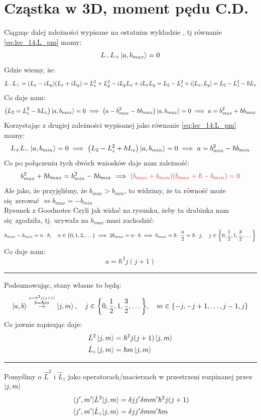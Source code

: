 \documentclass[12pt,a4paper]{report}
\newcommand{\com}[1]{{\color{red} #1}}
\newcommand{\linediv}{{\color{RubineRed} \rule{\linewidth}{0.5mm}}}
\newenvironment{lecture}[1]{\par\medskip
   \noindent\chapter{#1} \rmfamily}{\medskip}
\begin{document}

\begin{lecture}{Cząstka w 3D, moment pędu C.D.}
Ciągnąc dalej zależności wypisane na ostatnim wykładzie , tj równanie \eqref{eq:lec_14:L_pm} mamy:
\[
    L_{-}L_{+} \ket{a,b_{max}} = 0
\]
Gdzie wiemy, że:
\[
    L_{-}L_{+} = (L_x-iL_y)(L_x+iL_y) = L_x^2+L_y^2 - iL_yL_x + iL_xL_y = L_2 - L_z^2 + i\comm{L_x}{L_y} = L_2-L_z^2 -\hbar L_z
\]
Co daje nam:
\[
    \qty(L_2 = L_z^2 - \hbar L_z) \ket{a, b_{max}} = 0 \implies \qty(a - b^2_{max} - \hbar b_{max})\ket{a, b_{max}} = 0 \implies a = b_{max}^2 +\hbar b_{max}
\]
Korzystając z drugiej zależności wypisanej jako równanie \eqref{eq:lec_14:L_pm} mamy:
\[
    L_{+}L_{-}\ket{a, b_{min}} = 0 \implies \qty(L_2 - L_z^2 + \hbar L_z)\ket{a, b_{min}} = 0 \implies a = b_{min}^2 - \hbar b_{min}
\]
Co po połączeniu tych dwóch wniosków daje nam zależność:
\[
    b_{max}^2 + \hbar b_{max} = b_{min}^2 - \hbar b_{min} \implies \color{Red} \qty(b_{max} + b_{min})\qty(b_{max} + \hbar - b_{min}) = 0
\]
Ale jako, że przyjęliśmy, że $b_{max} > b_{min}$, to widzimy, że ta równość może się zerować $\iff b_{max} = - b_{min}$\\
\com{Rysunek z Goodnotes}
Czyli jak widać na rysunku, żeby ta drabinka nam się zgodziła, tj. urywała na $b_{max}$ musi zachodzić:
\[
    b_{max} - b_{min} = n \cdot \hbar \qc n\in\qty{0, 1, 2, \dots} \implies 2 b_{max} = n \cdot \hbar \implies b_{max} = \hbar \cdot \frac{n}{2} = \hbar \cdot j\qc j\in\qty{0, \frac12, 1,\frac32,\dots}
\]
Co daje nam:
\[
    a = \hbar^2 j (j+1)
\]

\linediv

Podsumowując, stany własne to będą:
\[
    \ket{a,b} \stackrel{\stackrel{a = \hbar^2 j (j+1)}{b = \hbar m}}{\to} \ket{j,m}\qc j\in \qty{0, \frac12, 1, \frac32,\dots}\qc m\in\qty{-j, -j+1, \dots, j-1, j}
\]
Co jawnie zapisując daje:
\begin{align*}
    \hat{L}^2 \ket{j,m} &= \hbar^2 j (j+1) \ket{j,m}\\
    \hat{L}_z \ket{j,m} &= \hbar m \ket{j,m}\\
\end{align*}

\linediv

Pomyślmy o $\hat{L}^2$ i $\hat{L}_z$ jako operatorach/macierzach w przestrzeni rozpinanej przez $\ket{j,m}$
\begin{align*}
    \mel{j',m'}{\hat{L}^2}{j,m} &= \delta{jj'}\delta{mm'}\hbar^2 j (j+1)\\
     \mel{j',m'}{\hat{L}_z}{j,m} &= \delta{jj'}\delta{mm'}\hbar m
\end{align*}


\end{lecture}
\end{document}
